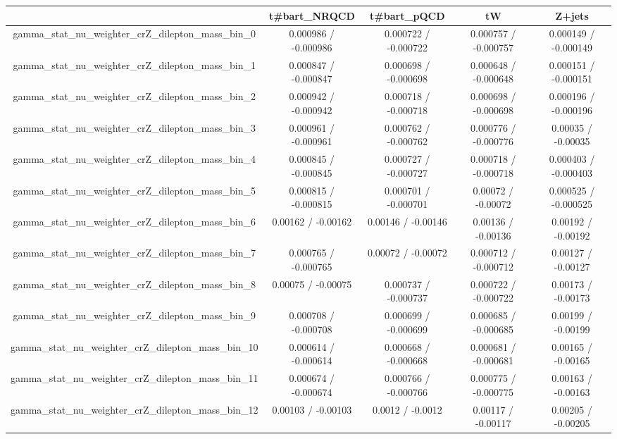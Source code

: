 \documentclass[10pt]{article}
\begin{document}
\begin{table}[htbp]
\begin{center}
\begin{tabular}{|c|c|c|c|c|}
\hline 
      & t#bar{t}_{NRQCD}      & t#bar{t}_{pQCD}      & tW      & Z+jets \\ 
\hline 
  gamma_stat_nu_weighter_crZ_dilepton_mass_bin_0 & 0.000986 / -0.000986 & 0.000722 / -0.000722 & 0.000757 / -0.000757 & 0.000149 / -0.000149 \\ 
  gamma_stat_nu_weighter_crZ_dilepton_mass_bin_1 & 0.000847 / -0.000847 & 0.000698 / -0.000698 & 0.000648 / -0.000648 & 0.000151 / -0.000151 \\ 
  gamma_stat_nu_weighter_crZ_dilepton_mass_bin_2 & 0.000942 / -0.000942 & 0.000718 / -0.000718 & 0.000698 / -0.000698 & 0.000196 / -0.000196 \\ 
  gamma_stat_nu_weighter_crZ_dilepton_mass_bin_3 & 0.000961 / -0.000961 & 0.000762 / -0.000762 & 0.000776 / -0.000776 & 0.00035 / -0.00035 \\ 
  gamma_stat_nu_weighter_crZ_dilepton_mass_bin_4 & 0.000845 / -0.000845 & 0.000727 / -0.000727 & 0.000718 / -0.000718 & 0.000403 / -0.000403 \\ 
  gamma_stat_nu_weighter_crZ_dilepton_mass_bin_5 & 0.000815 / -0.000815 & 0.000701 / -0.000701 & 0.00072 / -0.00072 & 0.000525 / -0.000525 \\ 
  gamma_stat_nu_weighter_crZ_dilepton_mass_bin_6 & 0.00162 / -0.00162 & 0.00146 / -0.00146 & 0.00136 / -0.00136 & 0.00192 / -0.00192 \\ 
  gamma_stat_nu_weighter_crZ_dilepton_mass_bin_7 & 0.000765 / -0.000765 & 0.00072 / -0.00072 & 0.000712 / -0.000712 & 0.00127 / -0.00127 \\ 
  gamma_stat_nu_weighter_crZ_dilepton_mass_bin_8 & 0.00075 / -0.00075 & 0.000737 / -0.000737 & 0.000722 / -0.000722 & 0.00173 / -0.00173 \\ 
  gamma_stat_nu_weighter_crZ_dilepton_mass_bin_9 & 0.000708 / -0.000708 & 0.000699 / -0.000699 & 0.000685 / -0.000685 & 0.00199 / -0.00199 \\ 
  gamma_stat_nu_weighter_crZ_dilepton_mass_bin_10 & 0.000614 / -0.000614 & 0.000668 / -0.000668 & 0.000681 / -0.000681 & 0.00165 / -0.00165 \\ 
  gamma_stat_nu_weighter_crZ_dilepton_mass_bin_11 & 0.000674 / -0.000674 & 0.000766 / -0.000766 & 0.000775 / -0.000775 & 0.00163 / -0.00163 \\ 
  gamma_stat_nu_weighter_crZ_dilepton_mass_bin_12 & 0.00103 / -0.00103 & 0.0012 / -0.0012 & 0.00117 / -0.00117 & 0.00205 / -0.00205 \\ 

\end{tabular}
\end{center}
\end{table}
\end{document}
